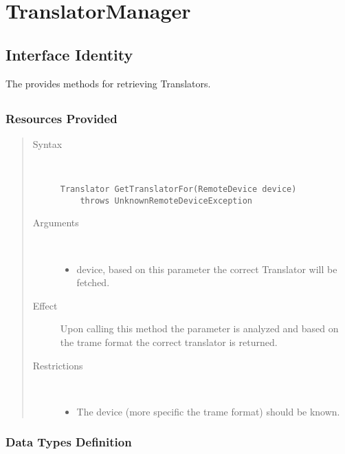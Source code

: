 \section{TranslatorManager}
\label{api:rm-translator-manager}

\subsection{Interface Identity}

\npar The  provides methods for retrieving
Translators.

\subsection{}

\subsubsection{Resources Provided}

\begin{quote}
	\begin{description}
		\item[Syntax] \
		\begin{verbatim}
Translator GetTranslatorFor(RemoteDevice device) 
    throws UnknownRemoteDeviceException
		\end{verbatim}
		\item[Arguments] \
		\begin{itemize}
		  \item device, based on this parameter the correct Translator will be
		  fetched.
		\end{itemize}
		\item[Effect] Upon calling this method the parameter is analyzed and based on
		the trame format the correct translator is returned.
		\item[Restrictions] \
		\begin{itemize}
		  \item The device (more specific the trame format) should be
			known.
		\end{itemize}
	\end{description} 
\end{quote}

\subsubsection{Data Types Definition}

